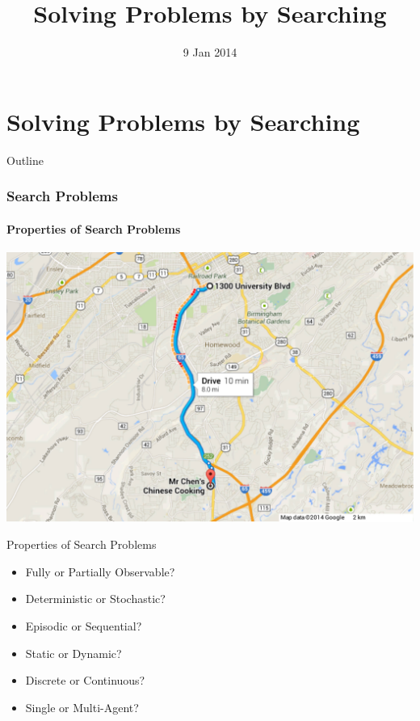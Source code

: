 \documentclass[14pt]{beamer}
\title{Solving Problems by Searching}
\date[]{9 Jan 2014}
\begin{document}
\begin{frame}
  \titlepage
\end{frame}

\part{Solving Problems by Searching}

\begin{frame}{Outline}
\tableofcontents
\end{frame}

\section{Search Problems}

\subsection{Properties of Search Problems}
\begin{frame}[plain]
	\begin{center}
		\includegraphics[width=\textwidth]{uab-to-mr-chens.pdf}
	\end{center}
\end{frame}

\begin{frame}{Properties of Search Problems}
	\begin{itemize}
		\item \alert<2->{Fully} or Partially Observable?
		\item \alert<2->{Deterministic} or Stochastic?
		\item Episodic or \alert<2->{Sequential}?
		\item \alert<2->{Static} or Dynamic?
		\item \alert<2->{Discrete} or Continuous?
		\item \alert<2->{Single} or Multi-Agent?
	\end{itemize}
\end{frame}
\end{document}
